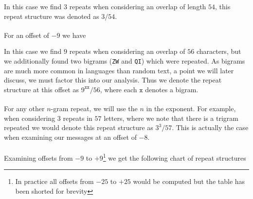   In this case we find $3$ repeats when considering an overlap of
  length $54$, this repeat structure was denoted as $3/54$.
  \\\\For an offset of $-9$ we have
  \begin{center}
  \end{center}
  In this case we find $9$ repeats when considering an overlap of
  $56$ characters, but we additionally found two bigrams (\texttt{ZW}
  and \texttt{QI}) which were repeated. As bigrams are much more
  common in languages than random text, a point we will later
  discuss, we must factor this into our analysis. Thus we denote the
  repeat structure at this offset as $9^{\texttt{xx}}/56$, where each
  $\texttt{x}$ denotes a bigram.\\\\For any other $n$-gram repeat, we
  will use the $n$ in the exponent. For example, when considering $3$
  repeats in $57$ letters, where we note that there is a trigram
  repeated we would denote this repeat structure as $3^{3}/57$. This
  is actually the case when examining our messages at an offset of $-8$.
  \\\\Examining offsets from $-9$ to $+9$\footnote{In practice all
    offsets from $-25$ to $+25$ would be computed but the table has
  been shorted for brevity} we get the following chart of repeat structures
